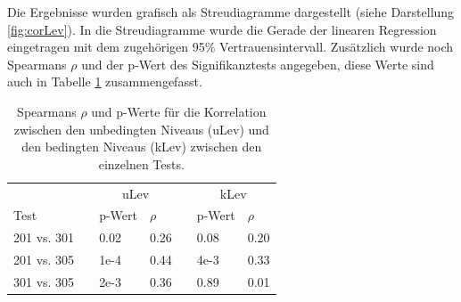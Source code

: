 Die Ergebnisse wurden grafisch als Streudiagramme dargestellt (siehe Darstellung \ref{fig:corLev}). In die Streudiagramme wurde die Gerade der linearen Regression eingetragen mit dem zugehörigen 95\% Vertrauensintervall. Zusätzlich wurde noch Spearmans $\rho$ und der p-Wert des Signifikanztests angegeben, diese Werte sind auch in Tabelle \ref{tab:CorNiveau} zusammengefasst.



\begin{table}[htbp]
  \centering
\begin{tabular}{@{}lllllll@{}}
\toprule
 &&  \multicolumn{2}{c}{uLev} &&  \multicolumn{2}{c}{kLev}\\ 
 \cmidrule{3-4}  \cmidrule{6-7}
 Test && p-Wert & $\rho$ && p-Wert & $\rho$  \\ 
\midrule
 201 vs. 301 &&   0.02 & 0.26 && 0.08 & 0.20    \\ 
 201 vs. 305 &&   1e-4 & 0.44 && 4e-3 & 0.33      \\
 301 vs. 305 &&   2e-3 & 0.36 && 0.89 & 0.01    \\
\bottomrule
\end{tabular} 
  \caption{Spearmans $\rho$ und p-Werte für die Korrelation zwischen den unbedingten Niveaus (uLev) und den bedingten Niveaus (kLev) zwischen den einzelnen Tests.  }
  \label{tab:CorNiveau}
\end{table}
 
